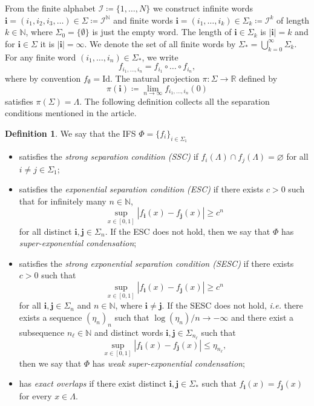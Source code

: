 \documentclass[12pt,]{article}
\theoremstyle{definition}
\newtheorem{definition}[theorem]{Definition}
\theoremstyle{remark}
\renewcommand{\Bbb}[1]{\mathbb{#1}}
\newcommand{\bbN}{{\Bbb N}}         %
\newcommand{\bbR}{{\Bbb R}}        %
\newcommand{\0}{\mathbf{0}}
\newcommand{\ie}{{\it i.e.}\/ }
\newcommand{\bi}{\mathbf{i}}
\newcommand{\bj}{\mathbf{j}}
\begin{document}
{From the finite alphabet $\mathcal{I}\coloneqq\{1,\ldots,N\}$ we construct infinite words $\bi=(i_1,i_2,i_3,\dots) \in\Sigma \coloneqq \mathcal{I}^{\bbN}$ and finite words $\bi=(i_1,\ldots,i_k)\in \Sigma_k\coloneqq \mathcal{I}^k$ of length $k\in\mathbb{N}$, where $\Sigma_0=\{\emptyset\}$ is just the empty word. The length of $\bi\in\Sigma_k$ is $|\bi|=k$ and for $\bi\in\Sigma$ it is $|\bi|=\infty$. We denote the set of all finite words by $\Sigma_* = \bigcup_{k=0}^\infty \Sigma_k$. For any finite word $(i_1,\dots,i_n)\in\Sigma_*$, we write
\[
f_{i_1,\dots,i_n} = f_{i_1}\circ \dots \circ f_{i_n},
\]
where by convention $f_{\emptyset}=\mathrm{Id}$. The natural projection $\pi\colon\Sigma\to\bbR$ defined by
\[
\pi(\bi)\coloneqq\lim_{n\to\infty}f_{i_1,\dots,i_n}(0)
\]
satisfies $\pi(\Sigma)=\Lambda$. The following definition collects all the separation conditions mentioned in the article.

\begin{definition}\label{def:SeparationConds}
We say that the IFS $\Phi=\{f_i\}_{i\in\Sigma_1}$ 
\begin{itemize}
	\item satisfies the \emph{strong separation condition (SSC)} if $f_i(\Lambda)\cap f_j(\Lambda)=\varnothing$ for all $i\neq j\in\Sigma_1$; 
	\item satisfies the \emph{exponential separation condition (ESC)} if there exists $c>0$ such that for infinitely many $n\in\mathbb{N}$,
	\[
	\sup_{x\in[0,1]} |f_{\bi}(x)-f_{\bj}(x)| \geq c^n
	\]
	for all distinct $\bi,\bj\in\Sigma_n$. If the ESC does not hold,
	then we say that $\Phi$ has \emph{super-exponential condensation}; 	
	\item satisfies the \emph{strong exponential separation condition (SESC)} if there exists $c>0$ such that
	\[
	\sup_{x\in[0,1]} |f_{\bi}(x)-f_{\bj}(x)| \geq c^n
	\]
	for all $\bi,\bj\in\Sigma_n$ and $n\in\bbN$, where $\bi\neq\bj$. If the SESC does not hold, \ie there exists a sequence $(\eta_n)_n$ such that $\log(\eta_n)/n\to-\infty$ and there exist a subsequence $n_{\ell}\in\bbN$ and distinct words $\bi,\bj\in\Sigma_{n_\ell}$ such that
	\[
	\sup_{x\in[0,1]}|f_{\bi}(x)-f_{\bj}(x)| \leq \eta_{n_\ell},
	\]
	then we say that $\Phi$ has \emph{weak super-exponential condensation}; 
	\item has \emph{exact overlaps} if there exist distinct $\bi,\bj\in\Sigma_*$ such that $f_{\bi}(x)=f_{\bj}(x)$ for every $x\in\Lambda$. 
\end{itemize}
\end{definition}

}
\end{document}
